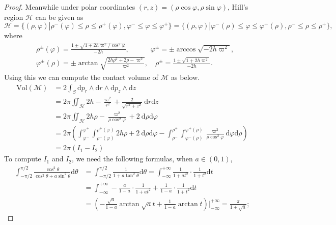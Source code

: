 \documentclass[10pt,a4paper]{amsart}
\newcommand{\om}{\varpi}
\begin{document}
\begin{proof}
	Meanwhile under polar coordinates $(r,z)=(\rho\cos\varphi,\rho\sin\varphi)$, Hill's region $\mathcal{H}$ can be given as
    $$\mathcal{H}=\{(\rho,\varphi)|\rho^-(\varphi)\leq\rho\leq\rho^+(\varphi), \varphi^-\leq\varphi\leq\varphi^+\}=\{(\rho,\varphi)|\varphi^-(\rho)\leq\varphi\leq\varphi^+(\rho), \rho^-\leq\rho\leq\rho^+\},$$
    where 
	$$\begin{aligned}
		&\rho^{\pm}(\varphi)=\frac{1\pm\sqrt{1+2h\om^2/\cos^2\varphi}}{-2h},\qquad \quad \varphi^{\pm}=\pm\arccos\sqrt{-2h\om^2},\\
		&\varphi^{\pm}(\rho)=\pm\arctan\sqrt{\frac{2h\rho^2+2\rho-\om^{2}}{\om^2}},\quad \rho^{\pm}=\frac{1\pm\sqrt{1+2h\om^2}}{-2h}.
	\end{aligned}$$
    Using this we can compute the contact volume of $\mathcal{M}$ as below. 
	\begin{equation}
		\begin{aligned}
			\text{Vol}(\mathcal{M})&=2\int_{S}\mathrm{d}p_{r}\wedge\mathrm{d}r\wedge\mathrm{d}p_{z}\wedge\mathrm{d}z\\
			&=2\pi\iint_{\mathcal{H}}2h-\frac{\om^{2}}{r^{2}}+\frac{2}{\sqrt{r^{2}+z^{2}}}\ \mathrm{d}r\mathrm{d}z\\
			&=2\pi\iint_{\mathcal{H}}2h\rho-\frac{\om^{2}}{\rho\cos^{2}\varphi}+2\ \mathrm{d}\rho\mathrm{d}\varphi\\
			&=2\pi\left(\int_{\varphi^-}^{\varphi^+}\int_{\rho^-(\varphi)}^{\rho^+(\varphi)}2h\rho+2\ \mathrm{d}\rho \mathrm{d}\varphi-\int_{\rho^-}^{\rho^+}\int_{\varphi^-(\rho)}^{\varphi^+(\rho)}\frac{\om^2}{\rho\cos^2\varphi} \mathrm{d}\varphi \mathrm{d}\rho\right)\\
			&=2\pi\left(I_{1}-I_{2}\right)
		\end{aligned}
	\end{equation}
	To compute $I_1$ and $I_2$, we need the following formulas, when $a\in(0,1)$,
	\begin{equation}\label{formula 1}
		\begin{aligned}
			\int_{-\pi\slash2}^{\pi\slash2}\frac{\cos^2\theta}{\cos^2\theta+a\sin^{2}\theta}\mathrm{d} \theta&=\int_{-\pi\slash2}^{\pi\slash2}\frac{1}{1+a\tan^{2}\theta}\mathrm{d} \theta=\int_{-\infty}^{+\infty}\frac{1}{1+at^2}\cdot\frac{1}{1+t^2}\mathrm{d}t\\
			&=\int_{-\infty}^{+\infty}-\frac{a}{1-a}\cdot\frac{1}{1+at^2}+\frac{1}{1-a}\cdot\frac{1}{1+t^2}\mathrm{d}t\\
			&=\left(-\frac{\sqrt{a}}{1-a}\arctan\sqrt{a}t+\frac{1}{1-a}\arctan t \right)\bigg|^{+\infty}_{-\infty}=\frac{\pi}{1+\sqrt{a}};

\end{aligned}
\end{equation}
\end{proof}
\end{document}
